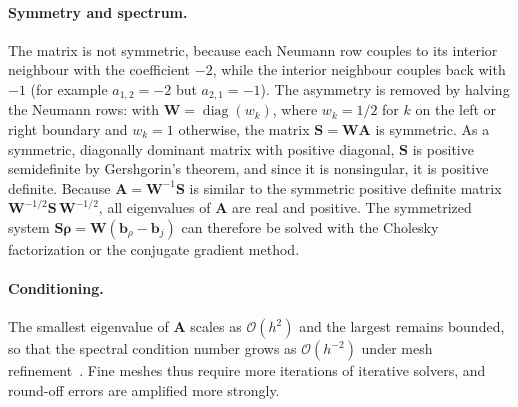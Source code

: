 \documentclass[11pt,a4paper]{article}
\numberwithin{equation}{section}
\theoremstyle{definition}
\theoremstyle{remark}
\newcommand{\bigO}[1]{\mathcal{O}\!\left(#1\right)}
\newcommand{\bA}{\mathbf{A}}
\newcommand{\bW}{\mathbf{W}}
\newcommand{\bS}{\mathbf{S}}
\newcommand{\brho}{\bm{\rho}}
\newcommand{\bb}{\bm{b}}
\begin{document}
\paragraph{Symmetry and spectrum.} The matrix is not symmetric, because each Neumann row
couples to its interior neighbour with the coefficient $-2$, while the interior neighbour
couples back with $-1$ (for example $a_{1,2} = -2$ but $a_{2,1} = -1$). The asymmetry is
removed by halving the Neumann rows: with $\bW = \operatorname{diag}(w_k)$, where $w_k =
1/2$ for $k$ on the left or right boundary and $w_k = 1$ otherwise, the matrix $\bS =
\bW\bA$ is symmetric. As a symmetric, diagonally dominant matrix with positive diagonal,
$\bS$ is positive semidefinite by Gershgorin's theorem, and since it is nonsingular, it is
positive definite. Because $\bA = \bW^{-1}\bS$ is similar to the symmetric positive
definite matrix $\bW^{-1/2}\bS\,\bW^{-1/2}$, all eigenvalues of $\bA$ are real and
positive. The symmetrized system $\bS\brho = \bW(\bb_\rho - \bb_j)$ can therefore be
solved with the Cholesky factorization or the conjugate gradient method.

\paragraph{Conditioning.} The smallest eigenvalue of $\bA$ scales as $\bigO{h^2}$ and the
largest remains bounded, so that the spectral condition number grows as $\bigO{h^{-2}}$
under mesh refinement~\citep{leveque2007}. Fine meshes thus require more iterations of
iterative solvers, and round-off errors are amplified more strongly.
\end{document}
